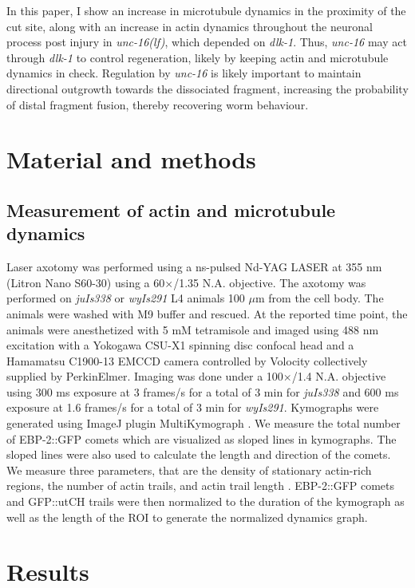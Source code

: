 \begin{appendices}
	In this paper, I show an increase in microtubule dynamics in the proximity of the cut site, along with an increase in actin dynamics throughout the neuronal process post injury in \textit{unc-16(lf)}, which depended on \textit{dlk-1}. Thus, \textit{unc-16} may act through \textit{dlk-1} to control regeneration, likely by keeping actin and microtubule dynamics in check. Regulation by \textit{unc-16} is likely important to maintain directional outgrowth towards the dissociated fragment, increasing the probability of distal fragment fusion, thereby recovering worm behaviour.
	
	\section{Material and methods}
	
	\subsection{Measurement of actin and microtubule dynamics}

	Laser axotomy was performed using a ns-pulsed Nd-YAG LASER at 355 nm (Litron Nano S60-30) using a 60$\times$/1.35 N.A. objective. The axotomy was performed on \textit{juIs338} or \textit{wyIs291} L4 animals 100 $\mu$m from the cell body. The animals were washed with M9 buffer and rescued. At the reported time point, the animals were anesthetized with 5 mM tetramisole and imaged using 488 nm excitation with a Yokogawa CSU-X1 spinning disc confocal head and a Hamamatsu C1900-13 EMCCD camera controlled by Volocity collectively supplied by PerkinElmer. Imaging was done under a 100$\times$/1.4 N.A. objective using 300 ms exposure at 3 frames/s for a total of 3 min for \textit{juIs338} and 600 ms exposure at 1.6 frames/s for a total of 3 min for \textit{wyIs291}. Kymographs were generated using ImageJ plugin MultiKymograph \parencite{schindelin2012}. We measure the total number of EBP-2::GFP comets which are visualized as sloped lines in kymographs. The sloped lines were also used to calculate the length and direction of the comets. We measure three parameters, that are the density of stationary actin-rich regions, the number of actin trails, and actin trail length \parencite{ganguly2015, sakamoto2005}. EBP-2::GFP comets and GFP::utCH trails were then normalized to the duration of the kymograph as well as the length of the ROI to generate the normalized dynamics graph. 
			
	\section{Results}
	

\end{appendices}
